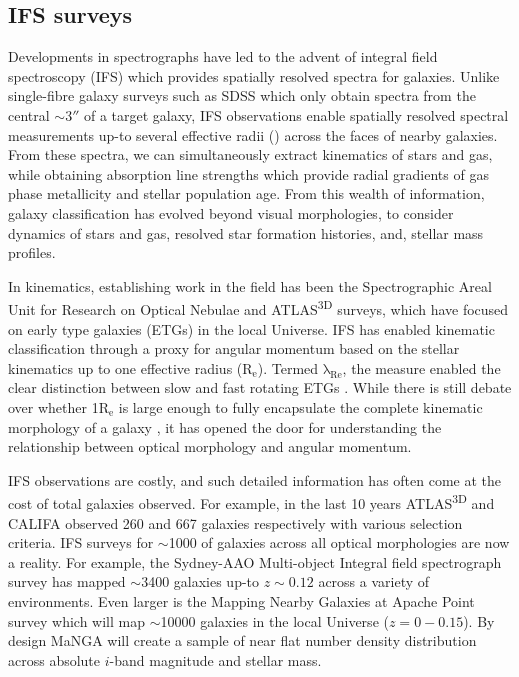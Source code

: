 \subsection{IFS surveys} \label{sec:ifs_surveys_intro}
Developments in spectrographs have led to the advent of integral field spectroscopy (IFS) which provides spatially resolved spectra for galaxies. Unlike single-fibre galaxy surveys such as SDSS which only obtain spectra from the central $\sim 3 ''$ of a target galaxy, IFS observations enable spatially resolved spectral measurements up-to several effective radii (\re) across the faces of nearby galaxies. From these spectra, we can simultaneously extract kinematics of stars and gas, while obtaining absorption line strengths which provide radial gradients of gas phase metallicity and stellar population age. From this wealth of information, galaxy classification has evolved beyond visual morphologies, to consider dynamics of stars and gas, resolved star formation histories, and, stellar mass profiles. 

In kinematics, establishing work in the field has been the Spectrographic Areal Unit for Research on Optical Nebulae \citep[SAURON;][]{sauron} and ATLAS\textsuperscript{3D} \citep{atlas3d} surveys, which have focused on early type galaxies (ETGs) in the local Universe. IFS has enabled kinematic classification through a proxy for angular momentum based on the stellar kinematics up to one effective radius ($\mathrm{R_e}$). Termed $\mathrm{\lambda_{Re}}$, the measure enabled the clear distinction between slow and fast rotating ETGs \citep{emsellem2007, emsellem2011}. While there is still debate over whether 1$\mathrm{R_{e}}$ is large enough to fully encapsulate the complete kinematic morphology of a galaxy \citep{foster2013, arnold2014}, it has opened the door for understanding the relationship between optical morphology and angular momentum. 

IFS observations are costly, and such detailed information has often come at the cost of total galaxies observed. For example, in the last 10 years ATLAS\textsuperscript{3D} and CALIFA \citep{califa} observed 260 and 667 galaxies respectively with various selection criteria. IFS surveys for $\sim$1000 of galaxies across all optical morphologies are now a reality. For example, the Sydney-AAO  Multi-object  Integral  field  spectrograph  survey \citep[][]{croom2012, bryant2015} has mapped $\sim$3400 galaxies up-to $z\sim0.12$ across a variety of environments. Even larger is the Mapping Nearby Galaxies at Apache Point \citep[MaNGA;][]{bundy2015, blanton2017} survey which will map $\sim$10000 galaxies in the local Universe ($z=0-0.15$). By design MaNGA will create a sample of near flat number density distribution across absolute $i$-band magnitude and stellar mass.


